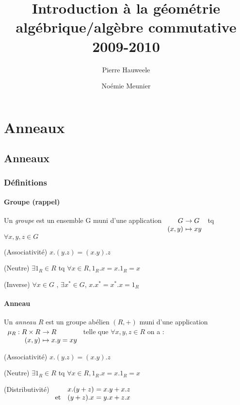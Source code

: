 \documentclass[reqno,a4paper,10pt]{report}
\author{Pierre Hauweele \and Noémie Meunier}
\title{Introduction à la géométrie algébrique/algèbre commutative\\2009-2010}
\makeatletter
\let\oldenumerate=\enumerate%
\renewenvironment{enumerate}{%
    \oldenumerate%
  }{%
    \@noparlisttrue%
    \endlist%
  }%
\makeatother
\begin{document}
\maketitle
\tableofcontents
\pagebreak
\part{Anneaux}
\chapter{Anneaux}
\section{Définitions}
\subsection{Groupe (rappel)} 
Un \emph{groupe} est un ensemble G muni d'une application
$\begin{array}[t]{r@{\ }l}
  G &\to G\\
  (x,y) &\mapsto xy
\end{array}$
tq $\forall x,y,z \in G$
\begin{enumerate}[(1)]
  \item (Associativité) $x.(y.z)=(x.y).z$
  \item (Neutre) $\exists 1_R \in R$ tq $\forall x \in R, 1_R.x = x.1_R = x$
  \item (Inverse) $\forall x \in G$ , $\exists x^*\in G$, $x.x^* = x^*.x = 1_R$
\end{enumerate}

\subsection{Anneau}
Un \emph{anneau} $R$ est un groupe abélien $(R, +)$ muni d'une application
$\begin{array}[t]{r@{\ }l}
  \mu_R: R \times R &\to R\\
  (x,y) &\mapsto x.y = xy
\end{array}$
telle que $\forall x,y,z \in R$ on a :
\begin{enumerate}[(1)]
  \item (Associativité) $x.(y.z)=(x.y).z$
  \item (Neutre) $\exists 1_R \in R$ tq $\forall x \in R, 1_R.x = x.1_R = x$
  \item (Distributivité) 
    $\begin{array}[t]{r@{\ }l}
      x.(y+z) &= x.y + x.z\\
      \text{et }~ ~ (y+z).x &= y.x + z.x
    \end{array}$
\end{enumerate}
\end{document}
